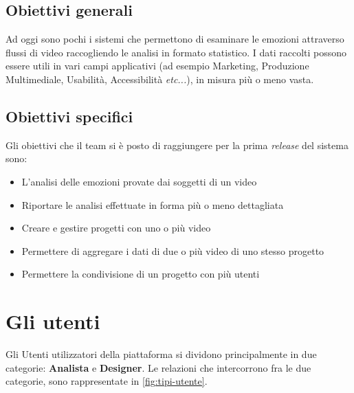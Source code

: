 \subsection{Obiettivi generali}\label{subsec:obiettivi-generali}

Ad oggi sono pochi i sistemi che permettono di esaminare le emozioni attraverso
flussi di video raccogliendo le analisi in formato statistico. I dati raccolti
possono essere utili in vari campi applicativi (ad esempio Marketing, Produzione
Multimediale, Usabilità, Accessibilità \textit{etc...}), in misura più o meno
vasta.

\subsection{Obiettivi specifici}\label{subsec:obiettivi-specifici}

Gli obiettivi che il team si è posto di raggiungere per la prima
\textit{release} del sistema sono:

\begin{itemize}
	\item L'analisi delle emozioni provate dai soggetti di un video
	\item Riportare le analisi effettuate in forma più o meno dettagliata
	\item Creare e gestire progetti con uno o più video
	\item Permettere di aggregare i dati di due o più video di uno stesso
	      progetto
	\item Permettere la condivisione di un progetto con più utenti
\end{itemize}

\section{Gli utenti}\label{sec:gli-utenti}

Gli Utenti utilizzatori della piattaforma si dividono principalmente in due
categorie: \textbf{Analista} e \textbf{Designer}. Le relazioni che intercorrono
fra le due categorie, sono rappresentate in \autoref{fig:tipi-utente}.


